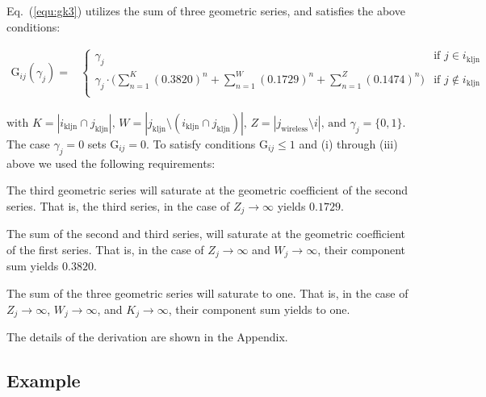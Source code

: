 \documentclass{ws-fnl2}
\begin{document}
Eq.~(\ref{equ:gk3}) utilizes the sum of three geometric series, and satisfies the above conditions:

\begin{equation}
\label{equ:gk3}
\begin{split}
\mathrm{G}_{ij}(\gamma_j) =&
 \begin{cases}
                                      \gamma_j & \text{if } j \in i_{\mathrm{kljn}} \\
                                      \gamma_j \cdot \big(\sum^K_{n=1}(0.3820)^n+\sum^W_{n=1}(0.1729)^n+\sum^Z_{n=1}(0.1474)^n\big) & \text{if }  j \notin i_{\mathrm{kljn}}\\ 
\end{cases}
\end{split}
\end{equation}

\noindent
$\text{with } K = |i_{\mathrm{kljn}} \cap j_{\mathrm{kljn}}| \text{, } W=|j_{\mathrm{kljn}} \setminus (i_{\mathrm{kljn}} \cap j_{\mathrm{kljn}})| \text{, } Z=|j_{\mathrm{wireless}} \setminus i| \text{, and } \gamma_j=\{0,1\}$. The case $\gamma_j=0$ sets G$_{ij}=0$. To satisfy conditions G$_{ij} \leq 1$ and (i) through (iii) above we used the following requirements:

\begin{romanlist}[(ii)]
 \item The third geometric series will saturate at the geometric coefficient of the second series. That is, the third series, in the case of $Z_j \rightarrow \infty$ yields $0.1729$.
 
 \item The sum of the second and third series, will saturate at the geometric coefficient of the first series. That is, in the case of $Z_j \rightarrow \infty$ and $W_j \rightarrow \infty$, their component sum yields $0.3820$. 
 
 \item The sum of the three geometric series will saturate to one. That is, in the case of $Z_j \rightarrow \infty$, $W_j \rightarrow \infty$, and $K_j \rightarrow \infty$, their component sum yields to one. 
\end{romanlist}

\noindent The details of the derivation are shown in the Appendix.


\subsection{Example}
\end{document}

